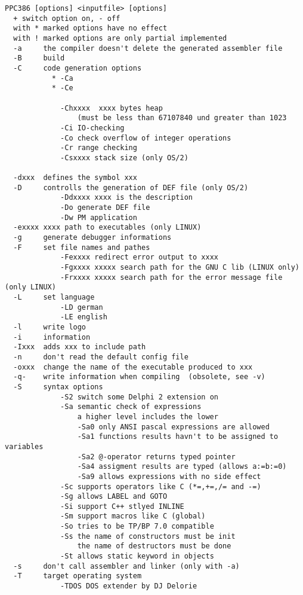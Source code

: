 \documentclass{report}
\begin{document}
\begin{verbatim}
PPC386 [options] <inputfile> [options]
  + switch option on, - off
  with * marked options have no effect
  with ! marked options are only partial implemented
  -a     the compiler doesn't delete the generated assembler file
  -B     build
  -C     code generation options
           * -Ca 
           * -Ce 
                 
             -Chxxxx  xxxx bytes heap 
                 (must be less than 67107840 und greater than 1023
             -Ci IO-checking
             -Co check overflow of integer operations
             -Cr range checking
             -Csxxxx stack size (only OS/2)
             
  -dxxx  defines the symbol xxx
  -D     controlls the generation of DEF file (only OS/2)
             -Ddxxxx xxxx is the description
             -Do generate DEF file
             -Dw PM application
  -exxxx xxxx path to executables (only LINUX)
  -g     generate debugger informations
  -F     set file names and pathes
             -Fexxxx redirect error output to xxxx
             -Fgxxxx xxxxx search path for the GNU C lib (LINUX only)
             -Frxxxx xxxxx search path for the error message file (only LINUX)
  -L     set language
             -LD german
             -LE english
  -l     write logo
  -i     information
  -Ixxx  adds xxx to include path
  -n     don't read the default config file
  -oxxx  change the name of the executable produced to xxx
  -q-    write information when compiling  (obsolete, see -v)
  -S     syntax options
             -S2 switch some Delphi 2 extension on
             -Sa semantic check of expressions
                 a higher level includes the lower
                 -Sa0 only ANSI pascal expressions are allowed
                 -Sa1 functions results havn't to be assigned to variables
                 -Sa2 @-operator returns typed pointer
                 -Sa4 assigment results are typed (allows a:=b:=0)
                 -Sa9 allows expressions with no side effect
             -Sc supports operators like C (*=,+=,/= and -=)
             -Sg allows LABEL and GOTO
             -Si support C++ stlyed INLINE
             -Sm support macros like C (global)
             -So tries to be TP/BP 7.0 compatible
             -Ss the name of constructors must be init
                 the name of destructors must be done
             -St allows static keyword in objects
  -s     don't call assembler and linker (only with -a)
  -T     target operating system
             -TDOS DOS extender by DJ Delorie

\end{verbatim}
\end{document}
